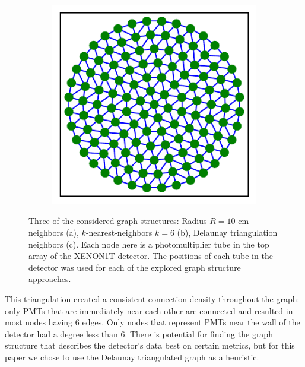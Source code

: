 \documentclass[../thesis.tex]{subfiles}
\begin{document}
\begin{figure}[t]
\begin{subfigure}{0.32\textwidth}
		\caption{}
		\label{fig:knn-graph}
	\end{subfigure}
	\begin{subfigure}{0.32\textwidth}
		\includegraphics[width=\textwidth]{figures/1T_delaunay-graph.pdf}
		\caption{}
		\label{fig:del-graph}
	\end{subfigure}
	\caption{
	Three of the considered graph structures: Radius $R=10$ cm neighbors (a), $k$-nearest-neighbors $k=6$ (b), Delaunay triangulation neighbors (c).
	Each node here is a photomultiplier tube in the top array of the XENON1T detector.
	The positions of each tube in the detector was used for each of the explored graph structure approaches.
	}
	\label{fig:graph_structs}
\end{figure}
\par This triangulation created a consistent connection density throughout the graph: only PMTs that are immediately near each other are connected and resulted in most nodes having 6 edges.
Only nodes that represent PMTs near the wall of the detector had a degree less than 6.
There is potential for finding the graph structure that describes the detector's data best on certain metrics, but for this paper we chose to use the Delaunay triangulated graph as a heuristic.
\end{document}
